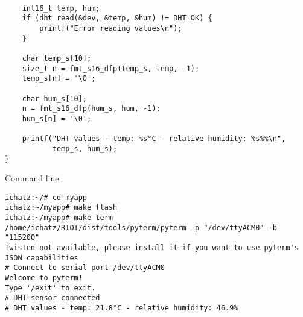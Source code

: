\documentclass[aspectratio=169]{beamer}
\begin{document}
\begin{frame}[fragile]{}

\begin{exampleblock}{}
\begin{verbatim}

    int16_t temp, hum;
    if (dht_read(&dev, &temp, &hum) != DHT_OK) {
        printf("Error reading values\n");
    }
    
    char temp_s[10];
    size_t n = fmt_s16_dfp(temp_s, temp, -1);
    temp_s[n] = '\0';
    
    char hum_s[10];
    n = fmt_s16_dfp(hum_s, hum, -1);
    hum_s[n] = '\0';        

    printf("DHT values - temp: %s°C - relative humidity: %s%%\n",
           temp_s, hum_s);
}
\end{verbatim}
\end{exampleblock}
\vspace{2cm}
\end{frame}


\begin{frame}[fragile]{}

\begin{alertblock}{Command line}
\begin{verbatim}
ichatz:~/# cd myapp
ichatz:~/myapp# make flash 
ichatz:~/myapp# make term
/home/ichatz/RIOT/dist/tools/pyterm/pyterm -p "/dev/ttyACM0" -b "115200"  
Twisted not available, please install it if you want to use pyterm's JSON capabilities
# Connect to serial port /dev/ttyACM0
Welcome to pyterm!
Type '/exit' to exit.
# DHT sensor connected
# DHT values - temp: 21.8°C - relative humidity: 46.9%
\end{verbatim}
\end{alertblock}
\vspace{2cm}
\end{frame}
\end{document}
